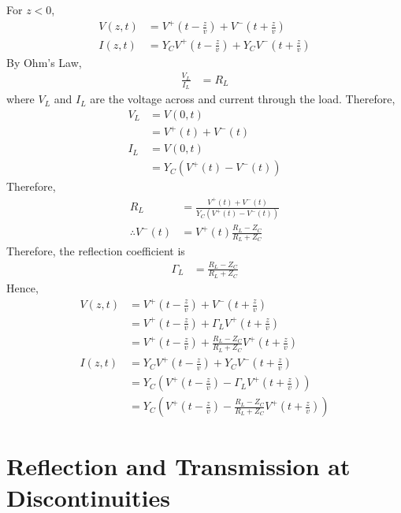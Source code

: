 \documentclass[titlepage, fleqn, a4paper, 12pt, twoside]{article}
\theoremstyle{definition}
\theoremstyle{theorem}
\begin{document}
\begin{solution}
	For $z < 0$,
	\begin{align*}
		V(z,t) &= V^+\left( t - \frac{z}{v} \right) + V^-\left( t + \frac{z}{v} \right)\\
		I(z,t) &= Y_C V^+\left( t - \frac{z}{v} \right) + Y_C V^-\left( t + \frac{z}{v} \right)
	\end{align*}
	By Ohm's Law,
	\begin{align*}
		\frac{V_L}{I_L} &= R_L
	\end{align*}
	where $V_L$ and $I_L$ are the voltage across and current through the load.
	Therefore,
	\begin{align*}
		V_L &= V(0,t)\\
		&= V^+(t) + V^-(t)\\
		I_L &= V(0,t)\\
		&= Y_C \left( V^+(t) - V^-(t) \right)
	\end{align*}
	Therefore,
	\begin{align*}
		R_L &= \frac{V^+(t) + V^-(t)}{Y_C\left( V^+(t) - V^-(t) \right)}\\
		\therefore V^-(t) &= V^+(t) \frac{R_L - Z_C}{R_L + Z_C}
	\end{align*}
	Therefore, the reflection coefficient is
	\begin{align*}
		\Gamma_L &= \frac{R_L - Z_C}{R_L + Z_C}
	\end{align*}
	Hence,
	\begin{align*}
		V(z,t) &= V^+\left( t - \frac{z}{v} \right) + V^-\left( t + \frac{z}{v} \right)\\
		&= V^+\left( t - \frac{z}{v} \right) + \Gamma_L V^+\left( t + \frac{z}{v} \right)\\
		&= V^+\left( t - \frac{z}{v} \right) + \frac{R_L - Z_C}{R_L + Z_C} V^+\left( t + \frac{z}{v} \right)\\
		I(z,t) &= Y_C V^+\left( t - \frac{z}{v} \right) + Y_C V^-\left( t + \frac{z}{v} \right)\\
		&= Y_C \left( V^+\left( t - \frac{z}{v} \right) - \Gamma_L V^+\left( t + \frac{z}{v} \right) \right)\\
		&= Y_C \left( V^+\left( t - \frac{z}{v} \right) - \frac{R_L - Z_C}{R_L + Z_C} V^+\left( t + \frac{z}{v} \right) \right)
	\end{align*}
\end{solution}

\section{Reflection and Transmission at Discontinuities}
\end{document}
